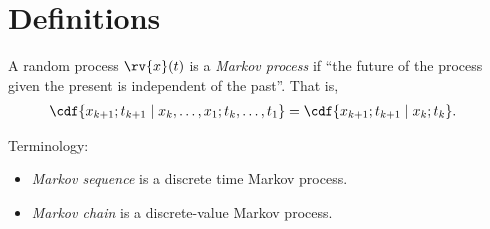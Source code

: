\section{Definitions}
\begin{definitionBox}
    A random process $\rv{x}(t)$ is a \emph{Markov process} if ``the future of the process given the present is independent of the past''. That is, 
    \begin{align}
        \cdf{x_{k+1}; t_{k+1}\mid x_{k},\ldots,x_{1}; t_{k},\ldots, t_{1}} &= \cdf{x_{k+1};t_{k+1}\mid x_{k}; t_{k}}.
    \end{align}
\end{definitionBox}
\begin{remarkBox}
    Terminology:
    \begin{itemize}
        \item \emph{Markov sequence} is a discrete time Markov process.
        \item \emph{Markov chain} is a discrete-value Markov process.
    \end{itemize}
\end{remarkBox}


